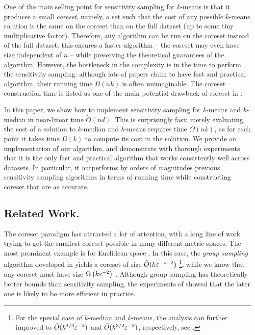 One of the main selling point for sensitivity sampling for $k$-means is that it produces a small \textit{coreset}, namely, a set such that the cost of any possible $k$-means solution is the same on the coreset than on the full dataset (up to some tiny multiplicative factor).
Therefore, any algorithm can be run on the coreset instead of the full dataset: this ensures a faster algorithm  -- the coreset may even have size independent of $n$ -- while preserving the theoretical guarantees of the algorithm.
However, the bottleneck in the complexity is in the time to perform the sensitivity sampling: although lots of papers claim to have fast and practical algorithm, their running time $\Omega(nk)$ is often 	unimaginable. The coreset construction time is listed as one of the main potential drawback of coreset in \cite{Feldman20}.


In this paper, we show how to implement sensitivity sampling for $k$-means and $k$-median in near-linear time $\tilde O(nd)$.
This is surprisingly fast: merely evaluating the cost of a solution to $k$-median and $k$-means requires time $\Omega(nk)$, as for each point it takes time $\Omega(k)$ to compute its cost in the solution. 
We provide an implementation of our algorithm, and demonstrate with thorough experiments that it is the only fast and practical algorithm that works consistently well across datasets.
In particular, it outperforms by orders of magnitudes previous sensitivity sampling algorithms in terms of running time while constructing coreset that are as accurate. 




\subsection{Related Work.}

The coreset paradigm has attracted a lot of attention, with a long line of work trying to get the smallest coreset possible in many different metric spaces. The most prominent example is for Euclidean space \cite{BadoiuHI02, HaM04, Chen09, HuangV20, stoc22}. 
In this case, the \textit{group sampling} algorithm developed in \cite{stoc21, stoc22} yields a coreset of size $\tilde{O}( k \varepsilon^{-z-2})$ \footnote{For the special case of $k$-median and $k$-means, the analysis can further improved to $\tilde{O}(k^{4/3} \varepsilon^{-2})$ and $\tilde{O}( k^{3/2} \varepsilon^{-2})$, respectively, see \cite{}.}, while we know that any coreset must have size $\Omega \left( k\varepsilon^{-2}\right)$ \cite{stoc22}.
Although group sampling has theoretically better bounds than sensitivity sampling, the experiments of \cite{chrisESA} showed that the later one is likely to be more efficient in practice.

